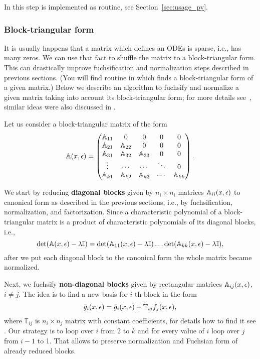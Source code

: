 \documentclass[12pt,a4paper]{article}
\def\M#1{\mathbb{#1}} %
\begin{document}
In \fuchsia this step is implemented as  routine, see Section~\ref{sec:usage_py}.

\subsubsection{Block-triangular form}
\label{sec:blockreduce}

It is usually happens that a matrix which defines an ODEs is sparse, i.e., has many zeros.
We can use that fact to shuffle the matrix to a block-triangular form.
This can drastically improve fuchsification and normalization steps described in previous sections.
(You will find  routine in \fuchsia which finds a block-triangular form of a given matrix.)
Below we describe an algorithm to fuchsify and normalize a given matrix taking into account its block-triangular form; for more details see~\cite[Section~7]{Lee15}, similar ideas were also discussed in \cite{Git15}.

Let us consider a block-triangular matrix of the form
\begin{equation}
\label{eq:bdiag}
\M A(x,\eps)=
\left(
\begin{matrix}
  \M A_{11} & 0      & 0 & 0 & 0
\\
  \M A_{21} & \M A_{22} & 0 & 0 & 0
\\
  \M A_{31} & \M A_{32} & \M A_{33} & 0 & 0
\\
  \vdots & \cdots & \cdots & \ddots & 0
\\
  \M A_{k1} & \M A_{k2} & \M A_{k3} & \cdots & \M A_{kk}
\end{matrix}
\right)
.
\end{equation}

We start by reducing {\bf diagonal blocks} given by $n_i \times n_i$ matrices $\M A_{ii}(x,\eps)$ to canonical form as described in the previous sections, i.e., by fuchsification, normalization, and factorization.
Since a characteristic polynomial of a block-triangular matrix is a product of characteristic polynomials of its diagonal blocks, i.e.,
\begin{equation}
  \det(\M A(x,\eps)-\lambda \M I) = \det(\M A_{11}(x,\eps) - \lambda\M I) \ldots  \det(\M A_{kk}(x,\eps) - \lambda \M I)
  ,
\end{equation}
after we put each diagonal block to the canonical form the whole matrix became normalized.

Next, we fuchsify {\bf non-diagonal blocks} given by rectangular matrices $\M A_{ij}(x,\eps)$, $i \ne j$.
The idea is to find a new basis for $i$-th block in the form
\begin{equation}
  \bar{g}_i(x,\eps) = \bar{g}_i(x,\eps) + \M T_{ij} \bar{f}_j(x,\eps),
\end{equation}
where $\M T_{ij}$ is $n_i \times n_j$ matrix with constant coefficients, for details how to find it see \cite[Section 7]{Lee15}.
Our strategy is to loop over $i$ from 2 to $k$ and for every value of $i$ loop over $j$ from $i-1$ to 1.
That allows to preserve normalization and Fuchsian form of already reduced blocks.
\end{document}

